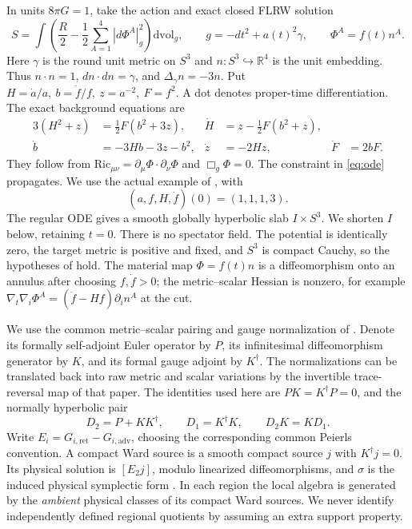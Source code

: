 \documentclass[11pt]{article}
\newcommand{\vol}{\mathrm{dvol}}
\begin{document}
In units \(8\pi G=1\), take the action and exact closed FLRW solution
\begin{equation}
 S=\int\left(\frac{R}{2}-\frac12\sum_{A=1}^4|d\Phi^A|_g^2\right)\vol_g,\qquad
 g=-dt^2+a(t)^2\gamma,\qquad \Phi^A=f(t)n^A .
 \label{eq:bg}
\end{equation}
Here \(\gamma\) is the round unit metric on \(S^3\) and \(n:S^3\hookrightarrow\mathbb R^4\) is the unit embedding. Thus \(n\cdot n=1\), \(dn\cdot dn=\gamma\), and \(\Delta_\gamma n=-3n\). Put \(H=\dot a/a,\ b=\dot f/f,\ z=a^{-2},\ F=f^2\). A dot denotes proper-time differentiation. The exact background equations are
\begin{align}
 3(H^2+z)&=\tfrac12 F(b^2+3z),&
 \dot H&=z-\tfrac12 F(b^2+z),\nonumber\\
 \dot b&=-3Hb-3z-b^2,&
 \dot z&=-2Hz,& \dot F&=2bF. \label{eq:ode}
\end{align}
They follow from \(\mathrm{Ric}_{\mu\nu}=\partial_\mu\Phi\cdot\partial_\nu\Phi\) and \(\Box_g\Phi=0\). The constraint in \eqref{eq:ode} propagates. We use the actual example of \cite{p09}, with
\begin{equation}
 (a,f,H,\dot f)(0)=(1,1,1,3).
 \label{eq:seed}
\end{equation}
The regular ODE gives a smooth globally hyperbolic slab \(I\times S^3\). We shorten \(I\) below, retaining \(t=0\). There is no spectator field. The potential is identically zero, the target metric is positive and fixed, and \(S^3\) is compact Cauchy, so the hypotheses of \cite{p09} hold. The material map \(\Phi=f(t)n\) is a diffeomorphism onto an annulus after choosing \(f,\dot f>0\); the metric--scalar Hessian is nonzero, for example \(\nabla_t\nabla_i\Phi^A=(\dot f-Hf)\partial_i n^A\) at the cut.

We use the common metric--scalar pairing and gauge normalization of \cite{p09}. Denote its formally self-adjoint Euler operator by \(P\), its infinitesimal diffeomorphism generator by \(K\), and its formal gauge adjoint by \(K^\dagger\). The normalizations can be translated back into raw metric and scalar variations by the invertible trace-reversal map of that paper. The identities used here are \(PK=K^\dagger P=0\), and the normally hyperbolic pair
\[
 D_2=P+KK^\dagger,\qquad D_1=K^\dagger K,\qquad D_2K=KD_1.
\]
Write \(E_i=G_{i,\mathrm{ret}}-G_{i,\mathrm{adv}}\), choosing the corresponding common Peierls convention. A compact Ward source is a smooth compact source \(j\) with \(K^\dagger j=0\). Its physical solution is \([E_2j]\), modulo linearized diffeomorphisms, and \(\sigma\) is the induced physical symplectic form \cite{p09,hack,khavpeierls}. In each region the local algebra is generated by the \emph{ambient} physical classes of its compact Ward sources. We never identify independently defined regional quotients by assuming an extra support property.
\end{document}
